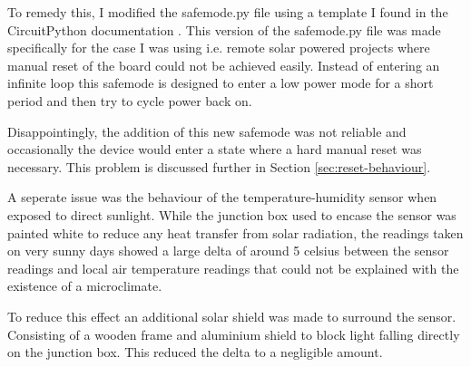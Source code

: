 To remedy this, I modified the safemode.py file using a template I found in the
CircuitPython documentation \cite{halbert2023safemode}. This version of the
safemode.py file was made specifically for the case I was using i.e. remote
solar powered projects where manual reset of the board could not be achieved
easily. Instead of entering an infinite loop this safemode is designed to enter
a low power mode for a short period and then try to cycle power back on.

Disappointingly, the addition of this new safemode was not reliable and
occasionally the device would enter a state where a hard manual reset was
necessary. This problem is discussed further in Section
\ref{sec:reset-behaviour}.

A seperate issue was the behaviour of the temperature-humidity sensor when
exposed to direct sunlight. While the junction box used to encase the sensor was
painted white to reduce any heat transfer from solar radiation, the readings
taken on very sunny days showed a large delta of around 5 celsius between the
sensor readings and local air temperature readings that could not be explained
with the existence of a microclimate.

To reduce this effect an additional solar shield was made to surround the
sensor. Consisting of a wooden frame and aluminium shield to block light falling
directly on the junction box. This reduced the delta to a negligible amount.
